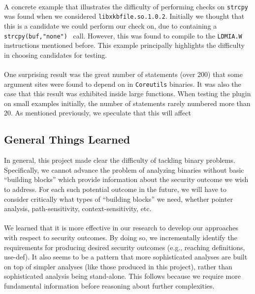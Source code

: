 \documentclass[letterpaper,11pt]{article}
\begin{document}
\paragraph{}
A concrete example that illustrates the difficulty of performing checks on
\texttt{strcpy} was found when we considered \texttt{libxkbfile.so.1.0.2}.
Initially we thought that this is a candidate we could perform our check on,
due to containing a \texttt{strcpy(buf,"none")}~\cite{xorg} call. However, this was found
to compile to the \texttt{LDMIA.W} instructions mentioned before. This example
principally highlights the difficulty in choosing candidates for testing.

\paragraph{}
One surprising result was the great number of statements (over
200) that some argument sites were found to depend on in \texttt{Coreutils}
binaries. It was also the case that this result was exhibited inside large
functions. When testing the plugin on small examples initially, the number of
statements rarely numbered more than 20. As mentioned previously, we speculate
that this will affect

\subsection{General Things Learned}

In general, this project made clear the difficulty of tackling binary
problems. Specifically, we cannot advance the problem of analyzing binaries
without basic ``building blocks'' which provide information about the security
outcome we wish to address. For each such potential outcome in the future,
we will have to consider critically what types of ``building blocks'' we need,
whether pointer analysis, path-sensitivity, context-sensitivity, etc.

\paragraph{}
We learned that it is more effective in our research to develop our approaches
with respect to security outcomes. By doing so, we incrementally identify the
requirements for producing desired security outcomes (e.g., reaching
definitions, use-def). It also seems to be a pattern that more sophisticated
analyses are built on top of simpler analyses (like those produced in this
project), rather than sophisticated analysis being stand-alone. This follows
because we require more fundamental information before reasoning about
further complexities.
\end{document}
